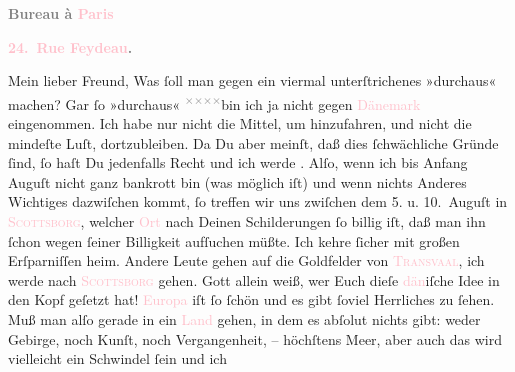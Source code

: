            \pstart
           \begin{otherlanguage}{french}\textcolor{gray}{\textbf{\textbf{Bureau à \textcolor{pink}{Paris}{}\ledrightnote{\textcolor{pink}{Paris}}}}}\end{otherlanguage}\pend
           \pstart
           \begin{otherlanguage}{french}\textcolor{gray}{\textbf{\textbf{\textcolor{pink}{24. Rue Feydeau}{}\ledrightnote{\textcolor{pink}{rue Feydeau}}.}}}\end{otherlanguage}\pend
           \pstart{}Mein lieber Freund,\pend\pstart
           Was ſoll man gegen ein viermal unterſtrichenes »durchaus« machen? Gar ſo »durchaus« \substVorne{}\textsuperscript{\textcolor{gray}{×}\-\textcolor{gray}{×}\-\textcolor{gray}{×}\-\textcolor{gray}{×}}\substDazwischen{}bin\substHinten{} ich ja nicht gegen \textcolor{pink}{Dänemark}{}\ledrightnote{\textcolor{pink}{Dänemark}}
               eingenommen. Ich habe nur nicht die Mittel, um hinzufahren, und nicht die mindeſte
               Luſt, dortzubleiben. Da Du aber meinſt, daß dies ſchwächliche Gründe ſind, ſo haſt Du
               jedenfalls Recht und ich werde \label{K_L02779-1v}\label{K_L02779-1h}. Alſo, wenn ich bis Anfang {\pb}Auguſt nicht ganz bankrott bin (was möglich iſt) und wenn
               nichts Anderes Wichtiges dazwiſchen kommt, ſo treffen wir uns zwiſchen dem 5. u. 10. Auguſt in \textsc{\textcolor{pink}{Scottsborg}{}\ledrightnote{\textcolor{pink}{Skodsborg}}}, welcher \textcolor{pink}{Ort}{} nach Deinen
               Schilderungen ſo billig iſt, daß man ihn ſchon wegen ſeiner Billigkeit aufſuchen
               müßte. Ich kehre ſicher mit großen Erſparniſſen heim. Andere Leute gehen auf die
               Goldfelder von \textsc{\textcolor{pink}{Transvaal}{}\ledrightnote{\textcolor{pink}{Transvaal}}}, ich werde nach \textsc{\textcolor{pink}{Scottsborg}{}\ledrightnote{\textcolor{pink}{Skodsborg}}} gehen. Gott allein weiß, wer Euch dieſe \textcolor{pink}{dän}{}iſche Idee in den Kopf geſetzt hat! {\pb}\textcolor{pink}{Europa}{}\ledrightnote{\textcolor{pink}{Europa}} iſt ſo ſchön und es gibt ſoviel Herrliches
               zu ſehen. Muß man alſo gerade in ein \textcolor{pink}{Land}{} gehen, in dem es  abſolut nichts gibt: weder Gebirge, noch Kunſt, noch Vergangenheit, – höchſtens Meer, aber auch das wird vielleicht ein Schwindel ſein und ich
